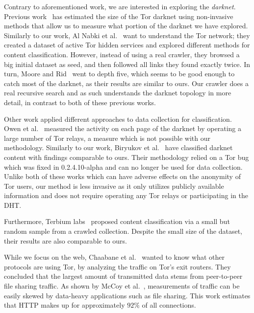Contrary to aforementioned work, we are interested in exploring the \emph{darknet}.
Previous work~\cite{GeorgeKadianakis2015,TorMetricsOnion} has estimated the size of the Tor darknet using non-invasive methods that allow us to measure what portion of the darknet we have explored.
Similarly to our work, Al Nabki et al.~\cite{Nabki2017} want to understand the Tor network; they created a dataset of active Tor hidden services and explored different methods for content classification. However, instead of using a real crawler, they browsed a big initial dataset as seed, and then followed all links they found exactly twice. In turn, Moore and Rid~\cite{Moore2016} went to depth five, which seems to be good enough to catch most of the darknet, as their results are similar to ours. Our crawler does a real recursive search and as such understands the darknet topology in more detail, in contrast to both of these previous works.

Other work applied different approaches to data collection for classification.
Owen et al.~\cite{Owen2016} measured the activity on each page of the darknet by operating a large number of Tor relays, a measure which is not possible with our methodology. Similarly to our work, Biryukov et al.~\cite{Biryukov2014} have classified darknet content with findings comparable to ours. Their methodology relied on a Tor bug which was fixed in 0.2.4.10-alpha and can no longer be used for data collection. Unlike both of these works which can have adverse effects on the anonymity of Tor users, our method is less invasive as it only utilizes publicly available information and does not require operating any Tor relays or participating in the DHT.

Furthermore, Terbium labs~\cite{ClareGollnick2016} proposed content classification via a small but random sample from a crawled collection. Despite the small size of the dataset, their results are also comparable to ours.

While we focus on the web, Chaabane et al.~\cite{Chaabane2010} wanted to know what other protocols are using Tor, by analyzing the traffic on Tor's exit routers. They concluded that the largest amount of transmitted data stems from peer-to-peer file sharing traffic. As shown by McCoy et al.~\cite{McCoy2008}, measurements of traffic can be easily skewed by data-heavy applications such as file sharing. This work estimates that HTTP makes up for approximately $92\%$ of all connections. 

